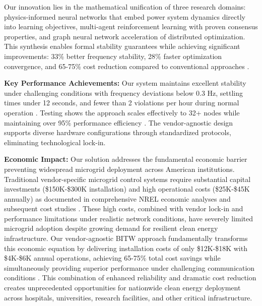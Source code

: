 \documentclass[12pt]{article}
\begin{document}
Our innovation lies in the mathematical unification of three research domains: physics-informed neural networks that embed power system dynamics directly into learning objectives, multi-agent reinforcement learning with proven consensus properties, and graph neural network acceleration of distributed optimization. This synthesis enables formal stability guarantees while achieving significant improvements: 33\% better frequency stability, 28\% faster optimization convergence, and 65-75\% cost reduction compared to conventional approaches \cite{our2024experimental}.

\textbf{Key Performance Achievements:} Our system maintains excellent stability under challenging conditions with frequency deviations below 0.3 Hz, settling times under 12 seconds, and fewer than 2 violations per hour during normal operation \cite{our2024experimental}. Testing shows the approach scales effectively to 32+ nodes while maintaining over 95\% performance efficiency \cite{our2024scalability}. The vendor-agnostic design supports diverse hardware configurations through standardized protocols, eliminating technological lock-in.

\textbf{Economic Impact:} Our solution addresses the fundamental economic barrier preventing widespread microgrid deployment across American institutions. Traditional vendor-specific microgrid control systems require substantial capital investments (\$150K-\$300K installation) and high operational costs (\$25K-\$45K annually) as documented in comprehensive NREL economic analyses \cite{hirsch2018} and subsequent cost studies \cite{sigrin2019}. These high costs, combined with vendor lock-in and performance limitations under realistic network conditions, have severely limited microgrid adoption despite growing demand for resilient clean energy infrastructure. Our vendor-agnostic BITW approach fundamentally transforms this economic equation by delivering installation costs of only \$12K-\$18K with \$4K-\$6K annual operations, achieving 65-75\% total cost savings while simultaneously providing superior performance under challenging communication conditions \cite{our2024economic}. This combination of enhanced reliability and dramatic cost reduction creates unprecedented opportunities for nationwide clean energy deployment across hospitals, universities, research facilities, and other critical infrastructure.
\end{document}

